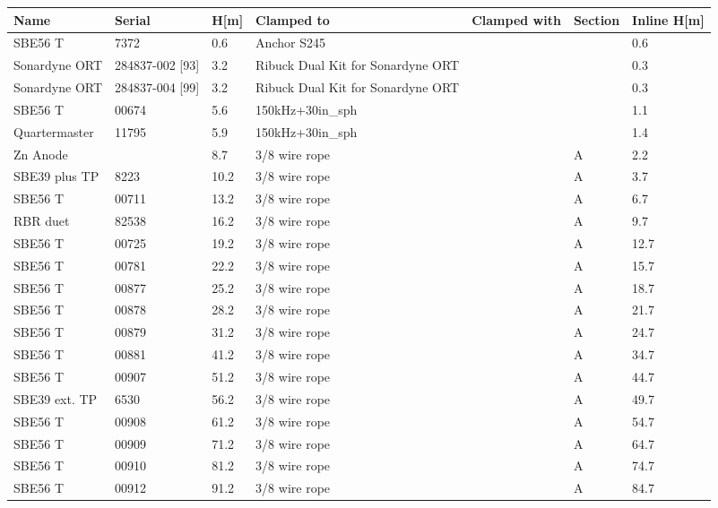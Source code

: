 \documentclass{article}
\begin{document}
\begin{tabularx}{\linewidth}{|l|l|l|X|l|l|l|}
\caption{S245 \textcolor{green}{$\blacksquare$}: Clamp-on summary}\\
\hline
\textbf{Name} & \textbf{Serial} & \textbf{H[m]} & \textbf{Clamped to} & \textbf{Clamped with} & \textbf{Section} & \textbf{Inline H[m]} \\
\hline
SBE56 T & 7372 & 0.6 & Anchor S245 &  &  & 0.6 \\ \hline
Sonardyne ORT & 284837-002 [93] & 3.2 & Ribuck Dual Kit for Sonardyne ORT &  &  & 0.3 \\ \hline
Sonardyne ORT & 284837-004 [99] & 3.2 & Ribuck Dual Kit for Sonardyne ORT &  &  & 0.3 \\ \hline
SBE56 T & 00674 & 5.6 & 150kHz+30in\_sph &  &  & 1.1 \\ \hline
Quartermaster & 11795 & 5.9 & 150kHz+30in\_sph &  &  & 1.4 \\ \hline
Zn Anode &  & 8.7 & 3/8 wire rope &  & A & 2.2 \\ \hline
SBE39 plus TP & 8223 & 10.2 & 3/8 wire rope &  & A & 3.7 \\ \hline
SBE56 T & 00711 & 13.2 & 3/8 wire rope &  & A & 6.7 \\ \hline
RBR duet & 82538 & 16.2 & 3/8 wire rope &  & A & 9.7 \\ \hline
SBE56 T & 00725 & 19.2 & 3/8 wire rope &  & A & 12.7 \\ \hline
SBE56 T & 00781 & 22.2 & 3/8 wire rope &  & A & 15.7 \\ \hline
SBE56 T & 00877 & 25.2 & 3/8 wire rope &  & A & 18.7 \\ \hline
SBE56 T & 00878 & 28.2 & 3/8 wire rope &  & A & 21.7 \\ \hline
SBE56 T & 00879 & 31.2 & 3/8 wire rope &  & A & 24.7 \\ \hline
SBE56 T & 00881 & 41.2 & 3/8 wire rope &  & A & 34.7 \\ \hline
SBE56 T & 00907 & 51.2 & 3/8 wire rope &  & A & 44.7 \\ \hline
SBE39 ext. TP & 6530 & 56.2 & 3/8 wire rope &  & A & 49.7 \\ \hline
SBE56 T & 00908 & 61.2 & 3/8 wire rope &  & A & 54.7 \\ \hline
SBE56 T & 00909 & 71.2 & 3/8 wire rope &  & A & 64.7 \\ \hline
SBE56 T & 00910 & 81.2 & 3/8 wire rope &  & A & 74.7 \\ \hline
SBE56 T & 00912 & 91.2 & 3/8 wire rope &  & A & 84.7 \\ \hline

\end{tabularx}
\end{document}

